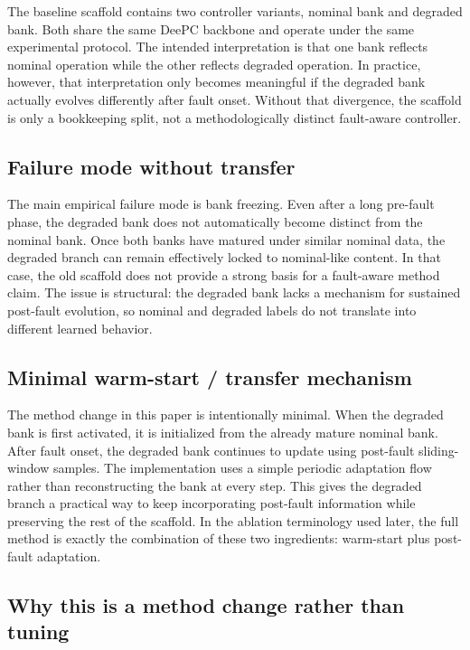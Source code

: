 \documentclass[12pt,a4paper]{article}
\begin{document}
The baseline scaffold contains two controller variants, nominal bank and degraded bank. Both share the same DeePC backbone and operate under the same experimental protocol. The intended interpretation is that one bank reflects nominal operation while the other reflects degraded operation. In practice, however, that interpretation only becomes meaningful if the degraded bank actually evolves differently after fault onset. Without that divergence, the scaffold is only a bookkeeping split, not a methodologically distinct fault-aware controller.

\subsection{Failure mode without transfer}

The main empirical failure mode is bank freezing. Even after a long pre-fault phase, the degraded bank does not automatically become distinct from the nominal bank. Once both banks have matured under similar nominal data, the degraded branch can remain effectively locked to nominal-like content. In that case, the old scaffold does not provide a strong basis for a fault-aware method claim. The issue is structural: the degraded bank lacks a mechanism for sustained post-fault evolution, so nominal and degraded labels do not translate into different learned behavior.

\subsection{Minimal warm-start / transfer mechanism}

The method change in this paper is intentionally minimal. When the degraded bank is first activated, it is initialized from the already mature nominal bank. After fault onset, the degraded bank continues to update using post-fault sliding-window samples. The implementation uses a simple periodic adaptation flow rather than reconstructing the bank at every step. This gives the degraded branch a practical way to keep incorporating post-fault information while preserving the rest of the scaffold. In the ablation terminology used later, the full method is exactly the combination of these two ingredients: warm-start plus post-fault adaptation.

\subsection{Why this is a method change rather than tuning}
\end{document}

